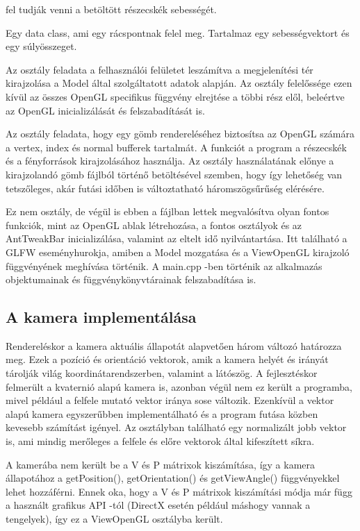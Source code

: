 \begin{description}[font=\normalfont\itshape\bfseries\space]
fel tudják venni a betöltött részecskék sebességét.
\item[ArrayElement:] 
Egy data class, 
ami egy rácspontnak felel meg. 
Tartalmaz egy sebességvektort és egy súlyösszeget. 
\item[ViewOpenGL:] Az osztály feladata a felhasználói felületet leszámítva 
a megjelenítési tér kirajzolása a Model által szolgáltatott adatok alapján. 
Az osztály felelőssége ezen kívül 
az összes OpenGL specifikus függvény elrejtése a többi rész elől, 
beleértve az OpenGL inicializálását és felszabadítását is.
\item[Sphere:] 
Az osztály feladata, 
hogy egy gömb rendereléséhez biztosítsa az OpenGL számára a vertex, 
index és normal bufferek tartalmát. 
A funkciót a program a részecskék és 
a fényforrások kirajzolásához használja. 
Az osztály használatának előnye a kirajzolandó gömb 
fájlból történő betöltésével szemben, 
hogy így lehetőség van tetszőleges, 
akár futási időben is változtatható háromszögsűrűség elérésére.
\item[main.cpp:] 
Ez nem osztály, 
de végül is ebben a fájlban lettek megvalósítva olyan fontos funkciók, 
mint az OpenGL ablak létrehozása, a fontos osztályok 
és az AntTweakBar inicializálása, 
valamint az eltelt idő nyilvántartása. 
Itt található a GLFW eseményhurokja, 
amiben a Model mozgatása és a ViewOpenGL kirajzoló függvényének meghívása történik. 
A {\ttfamily main.cpp} -ben történik
az alkalmazás objektumainak és függvénykönyvtárainak 
felszabadítása is.
\end{description}

\subsection{A kamera implementálása}

Rendereléskor a kamera aktuális állapotát alapvetően három változó határozza meg. 
Ezek a pozíció és orientáció vektorok, 
amik a kamera helyét és irányát tárolják világ koordinátarendszerben, 
valamint a látószög. 
A fejlesztéskor felmerült a kvaternió alapú kamera is, 
azonban végül nem ez került a programba, 
mivel például a felfele mutató vektor iránya sose változik. 
Ezenkívül a vektor alapú kamera egyszerűbben implementálható 
és a program futása közben kevesebb számítást igényel. 
Az osztályban található egy normalizált jobb vektor is, 
ami mindig merőleges 
a felfele és előre vektorok által kifeszített síkra. 

A kamerába nem került be a V és P mátrixok kiszámítása, 
így a kamera állapotához a {\ttfamily getPosition()}, 
{\ttfamily getOrientation()} és 
{\ttfamily getViewAngle()} függvényekkel lehet hozzáférni. 
Ennek oka, 
hogy a V és P mátrixok kiszámítási módja már függ a használt 
grafikus API -tól (DirectX esetén például máshogy vannak a tengelyek), 
így ez a {\ttfamily ViewOpenGL} osztályba került.


